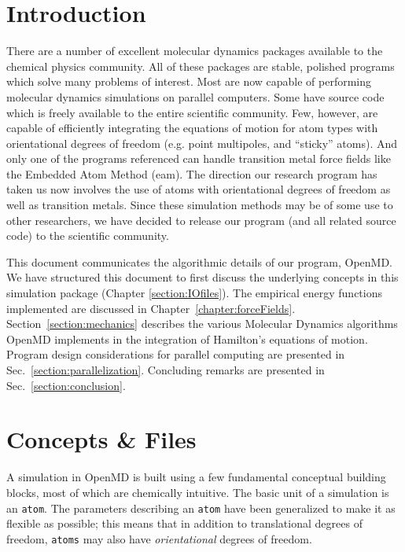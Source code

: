\documentclass[]{book}
\begin{document}
\tableofcontents
\listoffigures
\listoftables
 
\mainmatter

\chapter{\label{sec:intro}Introduction}

There are a number of excellent molecular dynamics packages available
to the chemical physics
community.\cite{Brooks83,MacKerell98,pearlman:1995,Gromacs,Gromacs3,DL_POLY,Tinker,Paradyn,namd,macromodel}
All of these packages are stable, polished programs which solve many
problems of interest.  Most are now capable of performing molecular
dynamics simulations on parallel computers.  Some have source code
which is freely available to the entire scientific community.  Few,
however, are capable of efficiently integrating the equations of
motion for atom types with orientational degrees of freedom
(e.g. point multipoles, and ``sticky'' atoms).  And only one of the
programs referenced can handle transition metal force fields like the
Embedded Atom Method ({\sc eam}).  The direction our research program
has taken us now involves the use of atoms with orientational degrees
of freedom as well as transition metals.  Since these simulation
methods may be of some use to other researchers, we have decided to
release our program (and all related source code) to the scientific
community.

This document communicates the algorithmic details of our program,
{\sc OpenMD}.  We have structured this document to first discuss the
underlying concepts in this simulation package (Chapter
\ref{section:IOfiles}).  The empirical energy functions implemented
are discussed in Chapter~\ref{chapter:forceFields}.
Section~\ref{section:mechanics} describes the various Molecular Dynamics
algorithms {\sc OpenMD} implements in the integration of Hamilton's
equations of motion.  Program design considerations for parallel
computing are presented in Sec.~\ref{section:parallelization}.
Concluding remarks are presented in Sec.~\ref{section:conclusion}.

\chapter{\label{section:IOfiles}Concepts \& Files}

A simulation in {\sc OpenMD} is built using a few fundamental
conceptual building blocks, most of which are chemically intuitive.
The basic unit of a simulation is an {\tt atom}.  The parameters
describing an {\tt atom} have been generalized to make it as flexible
as possible; this means that in addition to translational degrees of
freedom, {\tt atoms} may also have {\it orientational} degrees of
freedom.
\end{document}

